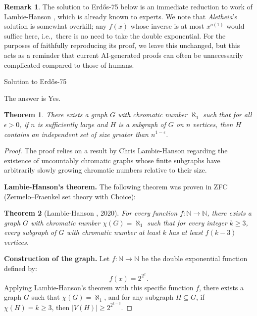 \documentclass{article}
\theoremstyle{plain}
\newtheorem{theorem}{Theorem}
\theoremstyle{definition}
\newtheorem{remark}{Remark}[section]
\newcommand{\Aletheia}{\emph{Aletheia}}
\begin{document}
\begin{remark}
The solution to Erd\H{o}s-75 below is an immediate reduction to work of Lambie-Hanson \cite{LH20}, which is already known to experts. We note that {\Aletheia}'s solution is somewhat overkill; any $f(x)$ whose inverse is at most $x^{o(1)}$ would suffice here, i.e.,~there is no need to take the double exponential. For the purposes of faithfully reproducing its proof, we leave this unchanged, but this acts as a reminder that current AI-generated proofs can often be unnecessarily complicated compared to those of humans.
\end{remark}

\begin{solution}{Solution to Erd\H{o}s-75}

The answer is Yes.

\begin{theorem}
There exists a graph $G$ with chromatic number $\aleph_1$ such that for all $\epsilon > 0$, if $n$ is sufficiently large and $H$ is a subgraph of $G$ on $n$ vertices, then $H$ contains an independent set of size greater than $n^{1-\epsilon}$.
\end{theorem}

\begin{proof}
The proof relies on a result by Chris Lambie-Hanson regarding the existence of uncountably chromatic graphs whose finite subgraphs have arbitrarily slowly growing chromatic numbers relative to their size.

\medskip
\noindent \textbf{Lambie-Hanson's theorem.}
The following theorem was proven in ZFC (Zermelo–Fraenkel set theory with Choice):

\begin{theorem}[Lambie-Hanson \cite{LH20}, 2020]
For every function $f: \mathbb{N} \to \mathbb{N}$, there exists a graph $G$ with chromatic number $\chi(G) = \aleph_1$ such that for every integer $k \ge 3$, every subgraph of $G$ with chromatic number at least $k$ has at least $f(k-3)$ vertices.
\end{theorem}


\medskip
\textbf{Construction of the graph.}
Let $f: \mathbb{N} \to \mathbb{N}$ be the double exponential function defined by:
$$ f(x) = 2^{2^x}. $$
Applying Lambie-Hanson's theorem with this specific function $f$, there exists a graph $G$ such that $\chi(G) = \aleph_1$, and for any subgraph $H \subseteq G$, if $\chi(H) = k \ge 3$, then $|V(H)| \ge 2^{2^{k-3}}$.


\end{proof}
\end{solution}
\end{document}
